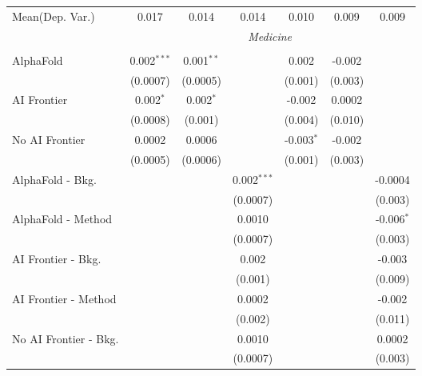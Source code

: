 \begin{tabular}{lcccccc}
Mean(Dep. Var.) & 0.017 & 0.014 & 0.014 & 0.010 & 0.009 & 0.009 \\
 & \multicolumn{6}{c}{\textit{Medicine}} \\ \\
   AlphaFold               & 0.002$^{***}$ & 0.001$^{**}$ &               & 0.002        & -0.002  &   \\   
                           & (0.0007)      & (0.0005)     &               & (0.001)      & (0.003) &   \\   
   AI Frontier             & 0.002$^{*}$   & 0.002$^{*}$  &               & -0.002       & 0.0002  &   \\   
                           & (0.0008)      & (0.001)      &               & (0.004)      & (0.010) &   \\   
   No AI Frontier          & 0.0002        & 0.0006       &               & -0.003$^{*}$ & -0.002  &   \\   
                           & (0.0005)      & (0.0006)     &               & (0.001)      & (0.003) &   \\   
   AlphaFold - Bkg.        &               &              & 0.002$^{***}$ &              &         & -0.0004\\   
                           &               &              & (0.0007)      &              &         & (0.003)\\   
   AlphaFold - Method      &               &              & 0.0010        &              &         & -0.006$^{*}$\\   
                           &               &              & (0.0007)      &              &         & (0.003)\\   
   AI Frontier - Bkg.      &               &              & 0.002         &              &         & -0.003\\   
                           &               &              & (0.001)       &              &         & (0.009)\\   
   AI Frontier - Method    &               &              & 0.0002        &              &         & -0.002\\   
                           &               &              & (0.002)       &              &         & (0.011)\\   
   No AI Frontier - Bkg.   &               &              & 0.0010        &              &         & 0.0002\\   
                           &               &              & (0.0007)      &              &         & (0.003)\\   

\end{tabular}
